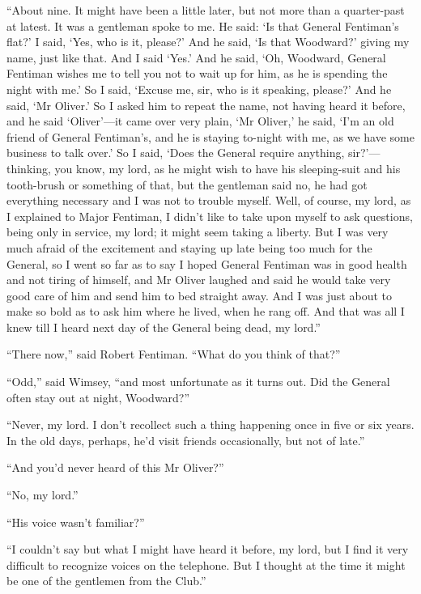 \enquote{About nine. It might have been a little later, but not more than a quarter-past at latest. It was a gentleman spoke to me. He said: \enquote{Is that General Fentiman's flat?} I said, \enquote{Yes, who is it, please?} And he said, \enquote{Is that Woodward?} giving my name, just like that. And I said \enquote{Yes.} And he said, \enquote{Oh, Woodward, General Fentiman wishes me to tell you not to wait up for him, as he is spending the night with me.} So I said, \enquote{Excuse me, sir, who is it speaking, please?} And he said, \enquote{Mr Oliver.} So I asked him to repeat the name, not having heard it before, and he said \enquote{Oliver}---it came over very plain, \enquote{Mr Oliver,} he said, \enquote{I'm an old friend of General Fentiman's, and he is staying to-night with me, as we have some business to talk over.} So I said, \enquote{Does the General require anything, sir?}---thinking, you know, my lord, as he might wish to have his sleeping-suit and his tooth-brush or something of that, but the gentleman said no, he had got everything necessary and I was not to trouble myself. Well, of course, my lord, as I explained to Major Fentiman, I didn't like to take upon myself to ask questions, being only in service, my lord; it might seem taking a liberty. But I was very much afraid of the excitement and staying up late being too much for the General, so I went so far as to say I hoped General Fentiman was in good health and not tiring of himself, and Mr Oliver laughed and said he would take very good care of him and send him to bed straight away. And I was just about to make so bold as to ask him where he lived, when he rang off. And that was all I knew till I heard next day of the General being dead, my lord.}

\enquote{There now,} said Robert Fentiman. \enquote{What do you think of that?}

\enquote{Odd,} said Wimsey, \enquote{and most unfortunate as it turns out. Did the General often stay out at night, Woodward?}

\enquote{Never, my lord. I don't recollect such a thing happening once in five or six years. In the old days, perhaps, he'd visit friends occasionally, but not of late.}

\enquote{And you'd never heard of this Mr Oliver?}

\enquote{No, my lord.}

\enquote{His voice wasn't familiar?}

\enquote{I couldn't say but what I might have heard it before, my lord, but I find it very difficult to recognize voices on the telephone. But I thought at the time it might be one of the gentlemen from the Club.}

